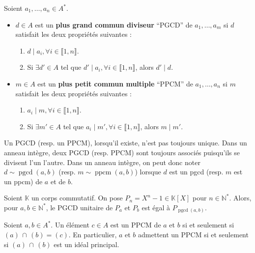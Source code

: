  \begin{definition}
    Soient $a_1, \dots, a_n \in A^*$.
    \begin{itemize}
      \item $d \in A$ est un \textbf{plus grand commun diviseur} ``PGCD'' de $a_1, \dots, a_m$ si $d$ satisfait les deux propriétés suivantes :
      \begin{enumerate}[label={\bfseries(\roman*)}]
        \item $d \mid a_i, \forall i \in \llbracket 1, n \rrbracket$.
        \item Si $\exists d' \in A$ tel que $d' \mid a_i, \forall i \in \llbracket 1, n \rrbracket$, alors $d' \mid d$.
      \end{enumerate}
      \item $m \in A$ est un \textbf{plus petit commun multiple} ``PPCM'' de $a_1, \dots, a_n$ si $m$ satisfait les deux propriétés suivantes :
      \begin{enumerate}[label={\bfseries(\roman*)}]
        \item $a_i \mid m, \forall i \in \llbracket 1, n \rrbracket$.
        \item Si $\exists m' \in A$ tel que $a_i \mid m', \forall i \in \llbracket 1, n \rrbracket$, alors $m \mid m'$.
      \end{enumerate}
    \end{itemize}
  \end{definition}

  \begin{remark}
    Un PGCD (resp. un PPCM), lorsqu'il existe, n'est pas toujours unique. Dans un anneau intègre, deux PGCD (resp. PPCM) sont toujours associés puisqu'ils se divisent l'un l'autre. Dans un anneau intègre, on peut donc noter $d \sim \operatorname{pgcd}(a, b)$ (resp. $m \sim \operatorname{ppcm}(a, b)$) lorsque $d$ est un pgcd (resp. $m$ est un ppcm) de $a$ et de $b$.
  \end{remark}


  \begin{example}
    Soient $\mathbb{K}$ un corps commutatif. On pose $P_n = X^n - 1 \in \mathbb{K}[X]$ pour $n \in \mathbb{N}^*$. Alors, pour $a, b \in \mathbb{N}^*$, le PGCD unitaire de $P_a$ et $P_b$ est égal à $P_{\operatorname{pgcd}(a,b)}$.
  \end{example}


  \begin{proposition}
    Soient $a, b \in A^*$. Un élément $c \in A$ est un PPCM de $a$ et $b$ si et seulement si $(a) \, \cap \, (b) = (c)$. En particulier, $a$ et $b$ admettent un PPCM si et seulement si $(a) \, \cap \, (b)$ est un idéal principal.
  \end{proposition}

